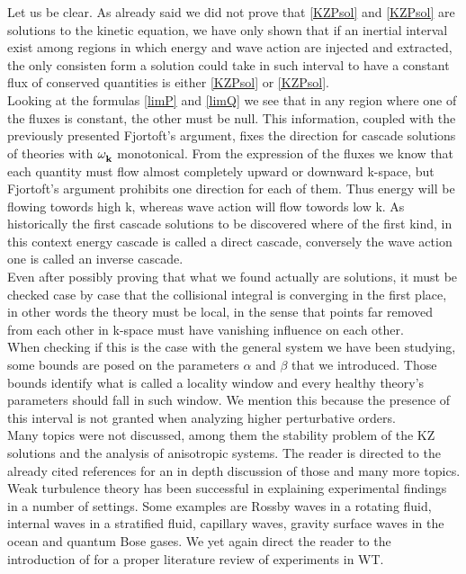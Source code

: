 Let us be clear. As already said we did not prove that \eqref{KZPsol} and \eqref{KZPsol} are solutions to the kinetic equation, we have only shown that if 
an inertial interval exist among regions in which energy and wave action are injected and extracted, the only consisten form a solution could take in such 
interval to have a constant flux of conserved quantities is either \eqref{KZPsol} or \eqref{KZPsol}. \\
Looking at the formulas \eqref{limP} and \eqref{limQ} we see that in any region where one of the fluxes is constant, the other must be null. This information, coupled 
with the previously presented Fjortoft's argument, fixes the direction for cascade solutions of theories with $\omega^{}_{\mathbf{k}}$ monotonical. From the expression of the fluxes 
we know that each quantity must flow almost completely upward or downward k-space, but Fjortoft's argument prohibits one direction for  each of them. Thus energy
will be flowing towords high k, whereas wave action will flow towords low k. As historically the first cascade solutions to be discovered where of the first kind, 
in this context energy cascade is called a direct cascade, conversely the wave action one is called an inverse cascade. \\

Even after possibly proving that what we found actually are solutions, it must be checked case by case that the collisional integral is converging in the first place,  in other words the theory must be local, in the sense that points far removed from each other in k-space must have vanishing influence on each other. \\
When checking if this is the case with the general system we have been studying, some bounds are posed on the parameters $\alpha$ and $\beta$ that we introduced.
Those bounds identify what is called a locality window and every healthy theory's parameters should fall in such window. We mention this because 
the presence of this interval is not granted when analyzing higher perturbative orders.\\ 
Many topics were not discussed, among them the stability problem of the KZ solutions and the analysis of anisotropic systems. The reader is directed to the 
already cited references for an in depth discussion of those and many more topics.\\

Weak turbulence theory has been successful in explaining experimental findings in a number of settings. Some examples are Rossby waves in a rotating fluid, internal waves 
in a stratified fluid, capillary waves, gravity surface waves in the ocean and quantum Bose gases. We yet again direct the reader to the introduction of \cite{Nazarenko2011} for a proper literature review of experiments in WT.\\


